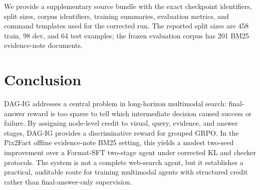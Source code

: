 \documentclass[11pt]{article}
\begin{document}
We provide a supplementary source bundle with the exact checkpoint identifiers, split sizes, corpus identifiers, training summaries, evaluation metrics, and command templates used for the corrected run. The reported split sizes are 458 train, 98 dev, and 64 test examples; the frozen evaluation corpus has 201 BM25 evidence-note documents.

\section{Conclusion}

DAG-IG addresses a central problem in long-horizon multimodal search: final-answer reward is too sparse to tell which intermediate decision caused success or failure. By assigning node-level credit to visual, query, evidence, and answer stages, DAG-IG provides a discriminative reward for grouped GRPO. In the Pix2Fact offline evidence-note BM25 setting, this yields a modest two-seed improvement over a Format-SFT two-stage agent under corrected KL and checker protocols. The system is not a complete web-search agent, but it establishes a practical, auditable route for training multimodal agents with structured credit rather than final-answer-only supervision.

\appendix




\end{document}
